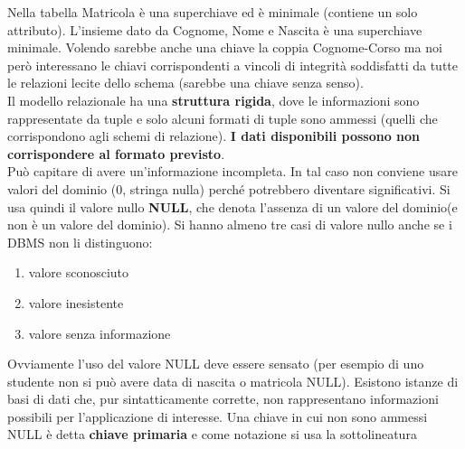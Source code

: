 \documentclass[a4paper,12pt, oneside]{book}
\begin{document}
Nella tabella Matricola è una superchiave ed è minimale (contiene un solo attributo). L'insieme dato da Cognome, Nome e Nascita è una superchiave minimale. Volendo sarebbe anche una chiave la coppia Cognome-Corso ma  noi però interessano le chiavi corrispondenti a vincoli di integrità soddisfatti da tutte le relazioni lecite dello schema (sarebbe una chiave senza senso).\\
Il modello relazionale ha una \textbf{struttura rigida}, dove le informazioni sono rappresentate da tuple e solo alcuni formati di tuple sono ammessi (quelli che corrispondono agli schemi di relazione). \textbf{I dati disponibili possono non corrispondere al formato previsto}.\\
Può capitare di avere un'informazione incompleta. In tal caso non conviene usare valori del dominio (0, stringa nulla) perché potrebbero diventare significativi. Si usa quindi il valore nullo \textbf{NULL}, che denota l'assenza di un valore del dominio(e non è un valore del dominio). Si hanno almeno tre casi di valore nullo anche se i DBMS non li distinguono:
\begin{enumerate}
	\item valore sconosciuto 
	\item valore inesistente 
	\item valore senza informazione
\end{enumerate}
Ovviamente l'uso del valore NULL deve essere sensato (per esempio di uno studente non si può avere data di nascita o matricola NULL). Esistono istanze di basi di dati che, pur sintatticamente corrette, non rappresentano informazioni possibili per l'applicazione di interesse. Una chiave in cui non sono ammessi NULL è detta \textbf{chiave primaria} e come notazione si usa la sottolineatura
\end{document}
